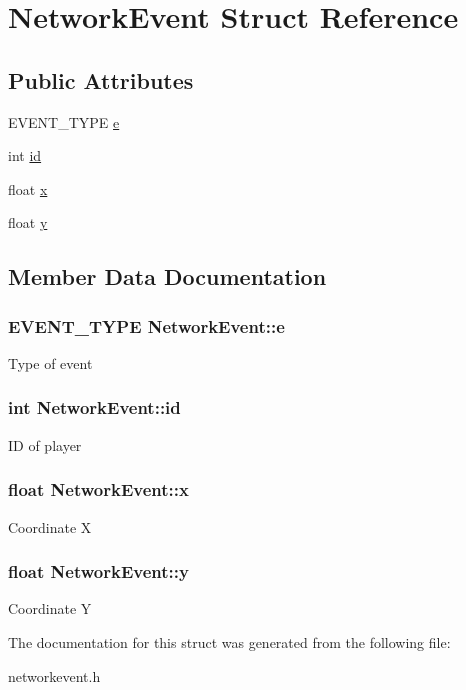 \hypertarget{struct_network_event}{\section{Network\-Event Struct Reference}
\label{struct_network_event}
}
\subsection*{Public Attributes}
\begin{DoxyCompactItemize}
\item 
E\-V\-E\-N\-T\-\_\-\-T\-Y\-P\-E \hyperlink{struct_network_event_a0f46f7a2c2876d3af113b5b50df06426}{e}
\item 
int \hyperlink{struct_network_event_a0af02587f6182ef3553fb6415d7e5b05}{id}
\item 
float \hyperlink{struct_network_event_ab847bb49581f345b762ba702fe41d505}{x}
\item 
float \hyperlink{struct_network_event_ac12a2de372b8b3604b0f862a7e56e7dc}{y}
\end{DoxyCompactItemize}


\subsection{Member Data Documentation}
\hypertarget{struct_network_event_a0f46f7a2c2876d3af113b5b50df06426}{
\subsubsection[{e}]{\setlength{\rightskip}{0pt plus 5cm}E\-V\-E\-N\-T\-\_\-\-T\-Y\-P\-E Network\-Event\-::e}}\label{struct_network_event_a0f46f7a2c2876d3af113b5b50df06426}
Type of event \hypertarget{struct_network_event_a0af02587f6182ef3553fb6415d7e5b05}{
\subsubsection[{id}]{\setlength{\rightskip}{0pt plus 5cm}int Network\-Event\-::id}}\label{struct_network_event_a0af02587f6182ef3553fb6415d7e5b05}
I\-D of player \hypertarget{struct_network_event_ab847bb49581f345b762ba702fe41d505}{
\subsubsection[{x}]{\setlength{\rightskip}{0pt plus 5cm}float Network\-Event\-::x}}\label{struct_network_event_ab847bb49581f345b762ba702fe41d505}
Coordinate X \hypertarget{struct_network_event_ac12a2de372b8b3604b0f862a7e56e7dc}{
\subsubsection[{y}]{\setlength{\rightskip}{0pt plus 5cm}float Network\-Event\-::y}}\label{struct_network_event_ac12a2de372b8b3604b0f862a7e56e7dc}
Coordinate Y 

The documentation for this struct was generated from the following file\-:\begin{DoxyCompactItemize}
\item 
networkevent.\-h\end{DoxyCompactItemize}
